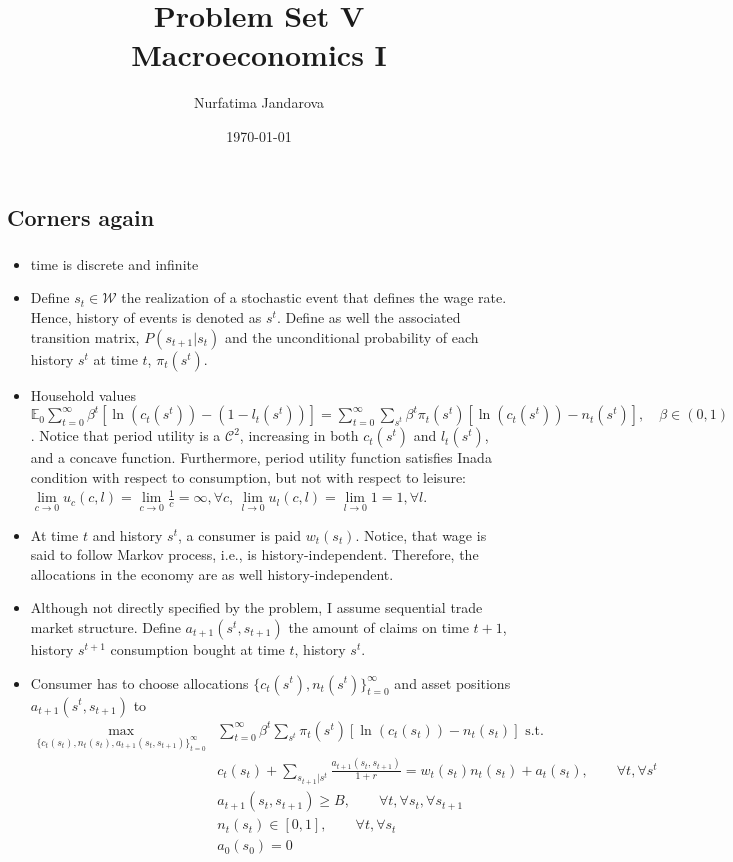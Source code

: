 \documentclass[]{article}
\title{Problem Set V \\ \large Macroeconomics I}
\author{Nurfatima Jandarova}
\date{\today}
\begin{document}
\maketitle

\subsection{Corners again}

\subsubsection{}
\begin{itemize}
	\item time is discrete and infinite
	\item Define $s_t\in\mathcal{W}$ the realization of a stochastic event that defines the wage rate. Hence, history of events is denoted as $s^t$. Define as well the associated transition matrix, $P(s_{t+1}|s_t)$ and the unconditional probability of each history $s^t$ at time $t$, $\pi_t(s^t)$.
	\item Household values $\mathbb{E}_0\sum\limits_{t = 0}^\infty\beta^t[\ln(c_t(s^t)) - (1 - l_t(s^t))] = \sum\limits_{t = 0}^\infty\sum\limits_{s^t}\beta^t\pi_t(s^t)[\ln(c_t(s^t)) - n_t(s^t)], \quad\beta\in(0, 1)$. Notice that period utility is a  $\mathcal{C}^2$, increasing in both $c_t(s^t)$ and $l_t(s^t)$, and a concave function. Furthermore, period utility function satisfies Inada condition with respect to consumption, but not with respect to leisure: $\lim\limits_{c\to0}u_c(c, l) = \lim\limits_{c\to0}\frac{1}{c} = \infty, \forall c$, $\lim\limits_{l\to0}u_l(c, l) = \lim\limits_{l\to0}1 = 1, \forall l$.
	\item At time $t$ and history $s^t$, a consumer is paid $w_t(s_t)$. Notice, that wage is said to follow Markov process, i.e., is history-independent. Therefore, the allocations in the economy are as well history-independent.
	\item Although not directly specified by the problem, I assume sequential trade market structure. Define $a_{t+1}(s^t, s_{t+1})$ the amount of claims on time $t+1$, history $s^{t+1}$ consumption bought at time $t$, history $s^t$.
	\item Consumer has to choose allocations $\{c_t(s^t), n_t(s^t)\}_{t = 0}^\infty$ and asset positions $a_{t+1}(s^t, s_{t+1})$ to
	\begin{equation}
		\begin{split}
			\max\limits_{\{c_t(s_t), n_t(s_t), a_{t+1}(s_t, s_{t+1})\}_{t = 0}^\infty}&\sum\limits_{t = 0}^\infty\beta^t\sum\limits_{s^t}\pi_t(s^t)[\ln(c_t(s_t)) - n_t(s_t)]\text{ s.t. }\\
			&c_t(s_t) + \sum\limits_{s_{t+1}|s^t}\frac{a_{t+1}(s_t, s_{t+1})}{1+r} = w_t(s_t)n_t(s_t) + a_t(s_t), \qquad\forall t, \forall s^t\nonumber\\
			&a_{t+1}(s_t, s_{t+1}) \geq B, \qquad \forall t, \forall s_t, \forall s_{t+1}\\
			&n_t(s_t)\in[0, 1], \qquad \forall t, \forall s_t\\
			&a_0(s_0) = 0
		\end{split}
	\end{equation}
\end{itemize}
\end{document}
